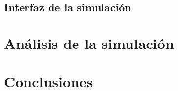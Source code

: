 \documentclass[11pt]{article}
\begin{document}
\subsection{Interfaz de la simulación}

\section{Análisis de la simulación}
\section{Conclusiones}
\end{document}

